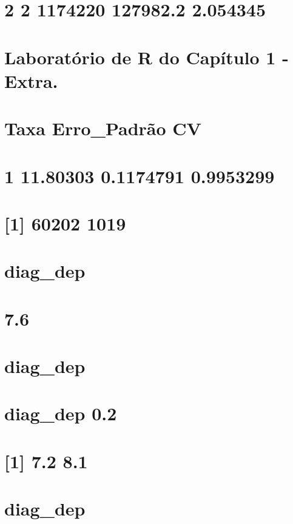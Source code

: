 \documentclass[]{book}
\theoremstyle{definition}
\theoremstyle{definition}
\theoremstyle{definition}
\theoremstyle{remark}
\begin{document}
\section{2 2 1174220 127982.2 2.054345}\label{section-2}

\section{Laboratório de R do Capítulo 1 -
Extra.}\label{laboratorio-de-r-do-capitulo-1---extra.}

\section{Taxa Erro\_Padrão CV}\label{taxa-erro_padrao-cv}

\section{1 11.80303 0.1174791 0.9953299}\label{section-3}

\section{{[}1{]} 60202 1019}\label{section-4}

\section{diag\_dep}\label{diag_dep}

\section{7.6}\label{section-5}

\section{diag\_dep}\label{diag_dep-1}

\section{diag\_dep 0.2}\label{diag_dep-0.2}

\section{{[}1{]} 7.2 8.1}\label{section-6}

\section{diag\_dep}\label{diag_dep-2}
\end{document}
